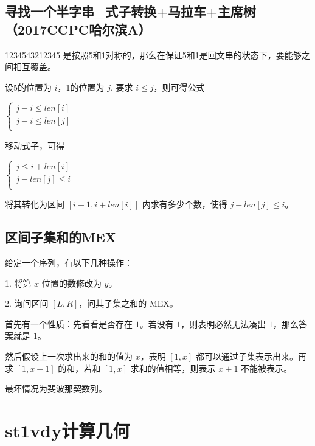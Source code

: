 \documentclass[landscape,twoside,a4paper]{article}
\begin{document}
\subsection{寻找一个半字串\_式子转换+马拉车+主席树（2017CCPC哈尔滨A）}
1234543212345 是按照5和1对称的，那么在保证5和1是回文串的状态下，要能够之间相互覆盖。\par
设5的位置为 $i$，1的位置为 $j$, 要求 $i \leq j$，则可得公式\par
$
\left\{\begin{matrix}
j-i \leq len[i] \\
j-i \leq len[j] \\
\end{matrix}\right.
$\par
移动式子，可得\par
$
\left\{\begin{matrix}
j \leq i+len[i] \\
j-len[j] \leq i \\
\end{matrix}\right.
$\par
将其转化为区间 $[i+1, i+len[i]]$ 内求有多少个数，使得 $j-len[j] \leq i$。


\subsection{区间子集和的MEX}
给定一个序列，有以下几种操作：\par
1. 将第 $x$ 位置的数修改为 $y$。\par
2. 询问区间 $[L, R]$，问其子集之和的 MEX。\par
首先有一个性质：先看看是否存在 $1$。若没有 $1$，则表明必然无法凑出 $1$，那么答案就是 $1$。\par
然后假设上一次求出来的和的值为 $x$，表明 $[1,x]$ 都可以通过子集表示出来。再求 $[1,x+1]$ 的和，若和 $[1,x]$ 求和的值相等，则表示 $x+1$ 不能被表示。\par
最坏情况为斐波那契数列。



\section{st1vdy计算几何}

\end{document}
